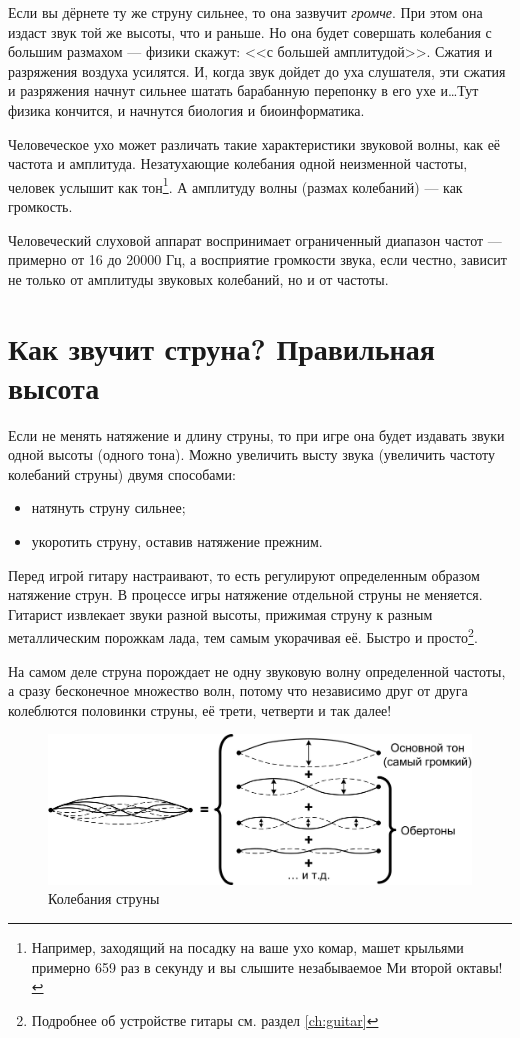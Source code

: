 Если вы дёрнете ту же струну сильнее, то она зазвучит \emph{громче}. При этом она издаст звук той же высоты, что и раньше. Но она будет совершать колебания с большим размахом --- физики скажут: <<с большей амплитудой>>. Сжатия и разряжения воздуха усилятся. И, когда звук дойдет до уха слушателя, эти сжатия и разряжения начнут сильнее шатать барабанную перепонку в его ухе и\ldots Тут физика кончится, и начнутся биология и биоинформатика.

Человеческое ухо может различать такие характеристики звуковой волны, как её частота и амплитуда. Незатухающие колебания одной неизменной частоты, человек услышит как тон\footnote{Например, заходящий на посадку на ваше ухо комар, машет крыльями примерно 659 раз в секунду и вы слышите незабываемое Ми второй октавы!}. А амплитуду волны (размах колебаний) --- как громкость. 

Человеческий слуховой аппарат воспринимает ограниченный диапазон частот --- примерно от 16 до 20000 Гц, а восприятие громкости звука, если честно, зависит не только от амплитуды звуковых колебаний, но и от частоты. 


\section{Как звучит струна? Правильная высота}
\label{ch:music:tone}

Если не менять натяжение и длину струны, то при игре она будет издавать звуки одной высоты (одного тона). Можно увеличить высту звука (увеличить частоту колебаний струны) двумя способами:
\begin{itemize}
    \item натянуть струну сильнее;
    \item укоротить струну, оставив натяжение прежним.
\end{itemize}

Перед игрой гитару настраивают, то есть регулируют определенным образом натяжение струн. В процессе игры натяжение отдельной струны не меняется. Гитарист извлекает звуки разной высоты, прижимая струну к разным металлическим порожкам лада, тем самым укорачивая её. Быстро и просто\footnote{Подробнее об устройстве гитары см. раздел \ref{ch:guitar}}. 

На самом деле струна порождает не одну звуковую волну определенной частоты, а сразу бесконечное множество волн, потому что независимо друг от друга колеблются половинки струны, её трети, четверти и так далее! 

\begin{figure}[!ht]
    \centering
    \includegraphics{fig/string-moving} 
    \caption{Колебания струны}\label{fig:music:tone:stringmoving}
\end{figure} 

